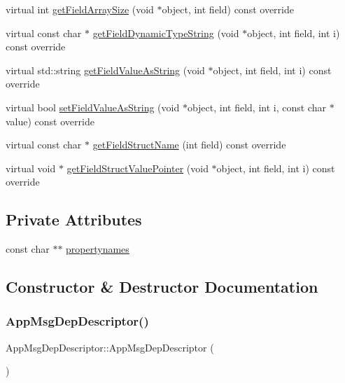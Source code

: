 \begin{DoxyCompactItemize}
virtual int \hyperlink{class_app_msg_dep_descriptor_abd6a2a77ab67f6d4e59a83a4608f1a9f}{get\+Field\+Array\+Size} (void $\ast$object, int field) const override
\item 
virtual const char $\ast$ \hyperlink{class_app_msg_dep_descriptor_a4badf7f0895de3039f46149053f19514}{get\+Field\+Dynamic\+Type\+String} (void $\ast$object, int field, int i) const override
\item 
virtual std\+::string \hyperlink{class_app_msg_dep_descriptor_a83fabb429ce26b55eed23aebe202570d}{get\+Field\+Value\+As\+String} (void $\ast$object, int field, int i) const override
\item 
virtual bool \hyperlink{class_app_msg_dep_descriptor_a47b4aaa772796c7ce821ea2ddff18ad1}{set\+Field\+Value\+As\+String} (void $\ast$object, int field, int i, const char $\ast$value) const override
\item 
virtual const char $\ast$ \hyperlink{class_app_msg_dep_descriptor_af2db18f3d30d0d62bbb5238777f8c478}{get\+Field\+Struct\+Name} (int field) const override
\item 
virtual void $\ast$ \hyperlink{class_app_msg_dep_descriptor_ae62715809f588f4f601bf524a6733be0}{get\+Field\+Struct\+Value\+Pointer} (void $\ast$object, int field, int i) const override
\end{DoxyCompactItemize}
\subsection*{Private Attributes}
\begin{DoxyCompactItemize}
\item 
const char $\ast$$\ast$ \hyperlink{class_app_msg_dep_descriptor_a03578bf1418ef896a9abfcded857b728}{propertynames}
\end{DoxyCompactItemize}


\subsection{Constructor \& Destructor Documentation}
\mbox{\label{class_app_msg_dep_descriptor_a9e34bc0dc8c5ebf87d3861c741a1ee78}} 
\subsubsection{\texorpdfstring{App\+Msg\+Dep\+Descriptor()}{AppMsgDepDescriptor()}}
{\footnotesize\ttfamily App\+Msg\+Dep\+Descriptor\+::\+App\+Msg\+Dep\+Descriptor (\begin{DoxyParamCaption}{ }\end{DoxyParamCaption})}

